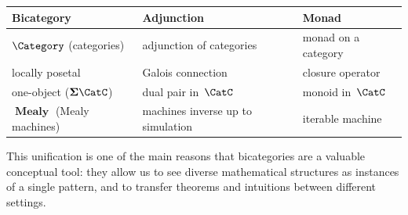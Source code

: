 \begin{center}
    \begin{tabular}{lll}
        \textbf{Bicategory} & \textbf{Adjunction} & \textbf{Monad} \\
        \hline
        $\Category$ (categories) & adjunction of categories & monad on a category \\
        locally posetal & Galois connection & closure operator \\
        one-object ($\mathbf{\Sigma}\CatC$) & dual pair in~$\CatC$ & monoid in~$\CatC$ \\
        $\operatorname{\textbf{Mealy}}$ (Mealy machines) & machines inverse up to simulation & iterable machine \\
    \end{tabular}
\end{center}

This unification is one of the main reasons that bicategories are a valuable conceptual tool: they allow us to see diverse mathematical structures as instances of a single pattern, and to transfer theorems and intuitions between different settings.
